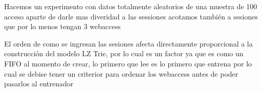  




 












Hacemos un experimento con datos totalmente aleatorios de una muestra de 100 acceso
aparte de darle mas diveridad a las sessiones acotamos también a sesiones que por lo menos tengan
3 webaccess 

 

El orden de como se ingresan las sesiones afecta directamente proporcional a la construcción del modelo LZ Trie,
por lo cual es un factor ya que es como un FIFO al momento de crear, lo primero que lee es lo primero que entrena
por lo cual se debise tener un criterior para ordenar los webaccess antes de poder pasarlos al entrenador

